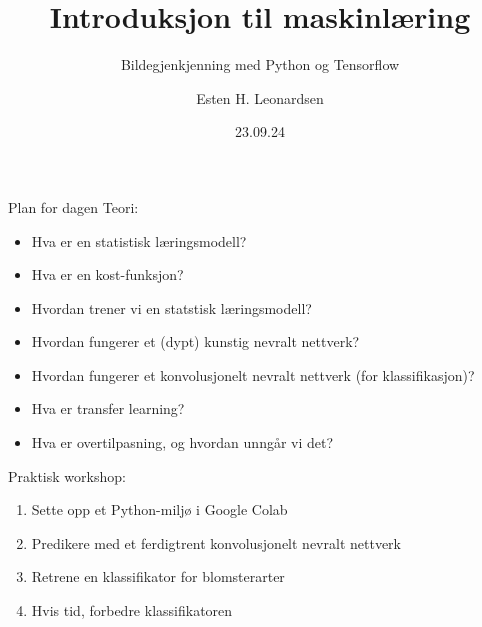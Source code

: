 \documentclass[8pt]{beamer}
\date{23.09.24}
\title{Introduksjon til maskinlæring}
\subtitle{Bildegjenkjenning med Python og Tensorflow}
\author{Esten H. Leonardsen}
\begin{document}
	\newcommand{\cnnchannel}[4]{
		\def\cellsize{0.15}
		\foreach \i in {1,...,#3} {
			\foreach \j in {1,...,#3} {
				\pgfmathsetmacro{\ioffset}{(\i - floor(#3 / 2))}
				\pgfmathsetmacro{\joffset}{(\j - floor(#3 / 2))}
				\node[
					draw=black,
					fill=green!20,
					minimum width=\cellsize cm,
					minimum height=\cellsize cm,
					anchor=south east,
					inner sep=0pt
				] (#4\i\j) at ({#1 - (\ioffset * \cellsize)}, {#2 - (\joffset * \cellsize)}) {};

			}
		}
	}

	\newcommand{\cnnlayer}[5]{
		\pgfmathsetmacro{\rounded}{floor(#4 / 2)}
		\message{\rounded}
		\foreach \c in {1,...,#4} {
			\pgfmathsetmacro{\offset}{\c - 1 - \rounded}
			\cnnchannel{#1 + \offset * 0.1}{#2 - \offset * 0.1}{#3}{#5\c}
		}
	}

	 \begin{frame}
	 	\maketitle
	 \end{frame}

	\begin{frame}{Plan for dagen}
		\vfill
		Teori:
		\begin{itemize}
			\item Hva er en statistisk læringsmodell?
			\item Hva er en kost-funksjon?
			\item Hvordan trener vi en statstisk læringsmodell?
			\item Hvordan fungerer et (dypt) kunstig nevralt nettverk?
			\item Hvordan fungerer et konvolusjonelt nevralt nettverk (for klassifikasjon)?
			\item Hva er transfer learning?
			\item Hva er overtilpasning, og hvordan unngår vi det?
		\end{itemize}
		Praktisk workshop:
		\begin{enumerate}
			\item Sette opp et Python-miljø i Google Colab
			\item Predikere med et ferdigtrent konvolusjonelt nevralt nettverk
			\item Retrene en klassifikator for blomsterarter
			\item Hvis tid, forbedre klassifikatoren
		\end{enumerate}
		\vfill
	\end{frame}
\end{document}
